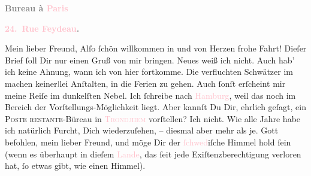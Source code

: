            \begin{otherlanguage}{french}\textcolor{gray}{\textbf{\textbf{Bureau à \textcolor{pink}{Paris}{}\ledrightnote{\textcolor{pink}{Paris}}}}}\end{otherlanguage}\pend
           \pstart
           \begin{otherlanguage}{french}\textcolor{gray}{\textbf{\textbf{\textcolor{pink}{24. Rue Feydeau}{}\ledrightnote{\textcolor{pink}{rue Feydeau}}.}}}\end{otherlanguage}\pend
           \pstart\center{}Mein lieber Freund,\pend\pstart
           Alſo ſchön willkommen in \label{K_L02780-1v}\label{K_L02780-1h} und von Herzen frohe
               Fahrt!\pend
           \pstart
           Dieſer Brief ſoll Dir nur einen Gruß von mir \strikeout{\textcolor{gray}{×}\-\textcolor{gray}{×}\-\textcolor{gray}{×}} bringen.\pend
           \pstart
           Neues weiß ich nicht. Auch hab’ ich keine Ahnung, wann ich von hier fortkomme. Die
               verfluchten Schwätzer im {\pb}\label{K_L02780-3v}\label{K_L02780-3h} machen keiner\textcolor{gray}{l}lei Anſtalten, in die Ferien zu gehen. Auch
               ſonſt erſcheint mir meine Reiſe im dunkelſten Nebel.\pend
           \pstart
           Ich ſchreibe  nach \textcolor{pink}{Hamburg}{}\ledrightnote{\textcolor{pink}{Hamburg}},
               weil das noch im Bereich der Vorſtellungs-Möglichkeit liegt. Aber kannſt Du Dir,
               ehrlich geſagt, ein \textsc{Poste restante}-Büreau in \textsc{\textcolor{pink}{Trondjhem}{}} vorſtellen? Ich nicht.\pend
           \pstart
           Wie alle Jahre habe ich natürlich Furcht, Dich {\pb}wiederzuſehen, – diesmal aber mehr als je.\pend
           \pstart
           Gott befohlen, mein lieber Freund, und möge Dir der \textcolor{pink}{ſchwed}{}iſche Himmel hold ſein (wenn es
               überhaupt in dieſem \textcolor{pink}{Lande}{},
               das ſeit \label{K_L02780-4v}\label{K_L02780-4h} jede Exiſtenzberechtigung verloren hat, ſo etwas gibt, wie einen Himmel).\pend
